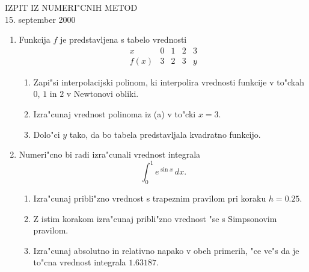 \documentclass[12pt,a4paper]{article}
\begin{document}
\begin{center}
  IZPIT IZ NUMERI"CNIH METOD\\
  15. september 2000
\end{center}
\begin{enumerate}

  \item Funkcija $f$ je predstavljena s tabelo vrednosti
    $$
    \begin{array}{c|ccc|c}
      x&0&1&2&3\\
      \hline
      f(x)&3&2&3&y
    \end{array}
    $$
  \begin{enumerate}
    \item Zapi"si interpolacijski polinom, ki interpolira vrednosti funkcije
    v to"ckah $0$, $1$ in $2$ v Newtonovi obliki.
    \item Izra"cunaj vrednost polinoma iz (a) v to"cki $x=3$.
    \item Dolo"ci $y$ tako, da bo tabela predstavljala kvadratno 
    funkcijo.
  \end{enumerate}

  \item Numeri"cno bi radi izra"cunali vrednost integrala
    $$\int_0^1 e^{\sin{x}}\,dx.$$
  \begin{enumerate}
      \item Izra"cunaj pribli"zno vrednost s trapeznim pravilom pri koraku
      $h=0.25$.
      \item Z istim korakom izra"cunaj pribli"zno vrednost "se s Simpsonovim
        pravilom.
      \item Izra"cunaj absolutno in relativno napako v obeh primerih, "ce ve"s
        da je to"cna vrednost integrala $1.63187$.
  \end{enumerate}

\end{enumerate}
\end{document}
